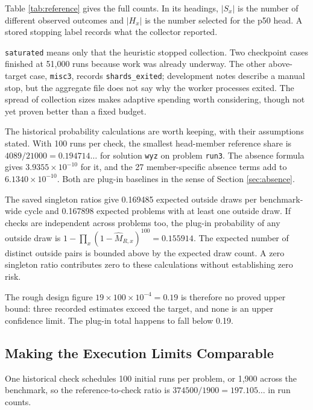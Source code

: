 \documentclass[10pt,letterpaper]{article}
\begin{document}
Table \ref{tab:reference} gives the full counts. In its headings, \(|S_x|\) is the number
of different observed outcomes and \(|H_x|\) is the number selected for the p50 head. A
stored stopping label records what the collector reported.



\texttt{saturated} means only that the heuristic stopped collection. Two checkpoint cases
finished at 51,000 runs because work was already underway. The other above-target case,
\texttt{misc3}, records \texttt{shards\_exited}; development notes describe a manual stop,
but the aggregate file does not say why the worker processes exited. The spread of
collection sizes makes adaptive spending worth considering, though not yet proven better
than a fixed budget.

The historical probability calculations are worth keeping, with their assumptions stated.
With 100 runs per check, the smallest head-member reference share is
\(4089/21000=0.194714\ldots\) for solution \texttt{wyz} on problem \texttt{run3}. The
absence formula gives \(3.9355\times10^{-10}\) for it, and the 27 member-specific absence
terms add to \(6.1340\times10^{-10}\). Both are plug-in baselines in the sense of Section
\ref{sec:absence}.

The saved singleton ratios give 0.169485 expected outside draws per benchmark-wide cycle
and 0.167898 expected problems with at least one outside draw. If checks are independent
across problems too, the plug-in probability of any outside draw is \(1-\prod_x(1-\widehat
M_{R,x})^{100}=0.155914\). The expected number of distinct outside pairs is bounded above
by the expected draw count. A zero singleton ratio contributes zero to these calculations
without establishing zero risk.

The rough design figure \(19\times100\times10^{-4}=0.19\) is therefore no proved upper
bound: three recorded estimates exceed the target, and none is an upper confidence limit.
The plug-in total happens to fall below 0.19.

\subsection{Making the Execution Limits Comparable}\label{sec:cost}

One historical check schedules 100 initial runs per problem, or 1,900 across the
benchmark, so the reference-to-check ratio is \(374500/1900=197.105\ldots\) in run counts.
\end{document}
